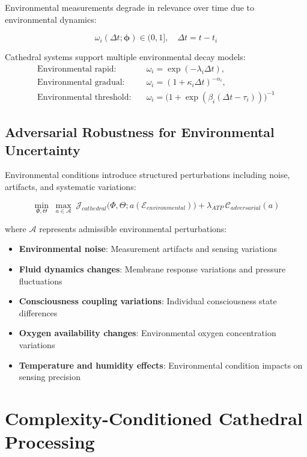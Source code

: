 \documentclass[12pt,a4paper]{article}
\begin{document}
Environmental measurements degrade in relevance over time due to environmental dynamics:

\begin{equation}
\omega_i(\Delta t; \bm{\phi}) \in (0,1], \quad \Delta t = t - t_i
\end{equation}

Cathedral systems support multiple environmental decay models:
\begin{align}
\text{Environmental rapid:}\quad & \omega_i = \exp(-\lambda_i \Delta t), \\
\text{Environmental gradual:}\quad & \omega_i = (1 + \kappa_i \Delta t)^{-\alpha_i}, \\
\text{Environmental threshold:}\quad & \omega_i = \bigl(1 + \exp(\beta_i(\Delta t - \tau_i))\bigr)^{-1}
\end{align}

\subsection{Adversarial Robustness for Environmental Uncertainty}

Environmental conditions introduce structured perturbations including noise, artifacts, and systematic variations:

\begin{equation}
\min_{\Phi,\Theta} \; \max_{a \in \mathcal{A}} \; \mathcal{J}_{cathedral}\bigl(\Phi,\Theta; a(\mathcal{E}_{environmental})\bigr) + \lambda_{ATP}\, \mathcal{C}_{adversarial}(a)
\end{equation}

where $\mathcal{A}$ represents admissible environmental perturbations:
\begin{itemize}
\item \textbf{Environmental noise}: Measurement artifacts and sensing variations
\item \textbf{Fluid dynamics changes}: Membrane response variations and pressure fluctuations
\item \textbf{Consciousness coupling variations}: Individual consciousness state differences
\item \textbf{Oxygen availability changes}: Environmental oxygen concentration variations
\item \textbf{Temperature and humidity effects}: Environmental condition impacts on sensing precision
\end{itemize}

\section{Complexity-Conditioned Cathedral Processing}
\end{document}
